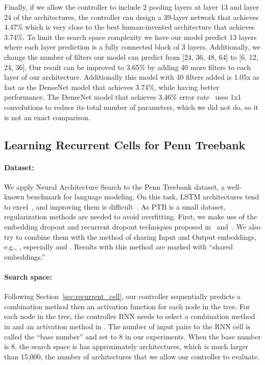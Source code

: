 \documentclass{article} \usepackage{iclr2017_conference,times}
\begin{document}
Finally, if we allow the controller to include 2 pooling layers at layer 13 and layer 24 of the architectures, the controller can design a 39-layer network that achieves 4.47\% which is very close to the best human-invented architecture that achieves 3.74\%. To limit the search space complexity we have our model predict 13 layers where each layer prediction is a fully connected block of 3 layers. Additionally, we change the number of filters our model can predict from [24, 36, 48, 64] to [6, 12, 24, 36]. Our result can be improved to 3.65\% by adding 40 more filters  to each layer of our architecture. Additionally this model with 40 filters added is 1.05x as fast as the DenseNet model that achieves 3.74\%, while having better performance. The DenseNet model that achieves 3.46\% error rate~\citep{Huang2016Densely2} uses 1x1 convolutions to reduce its total number of parameters, which we did not do, so it is not an exact comparison.



\subsection{Learning Recurrent Cells for Penn Treebank}









\paragraph{Dataset:} We apply Neural Architecture Search to the Penn Treebank dataset, a well-known benchmark for language modeling. On this task, LSTM architectures tend to excel~\citep{ZarembaReg, Gal2015}, and improving them is  difficult~\citep{jozefowicz2015empirical}. As PTB is a small dataset, regularization methods are needed to avoid overfitting. First, we make use of the embedding dropout and recurrent dropout techniques proposed in~\cite{ZarembaReg} and~\citep{Gal2015}. We also try to combine them with the method of sharing Input and Output embeddings, e.g., \cite{bengio2003neural,mnih2007three}, especially \cite{SocherEmbedding} and \cite{shareEmbedding}. Results with this method are marked with ``shared embeddings.''



\paragraph{Search space:} Following Section~\ref{sec:recurrent_cell}, our controller sequentially predicts a combination method then an activation function for each node in the tree. 
For each node in the tree, the controller RNN needs to select a combination method in  and an activation method in . The number of input pairs to the RNN cell is called the ``base number'' and set to 8 in our experiments. When the base number is 8, the search space is has approximately  architectures, which is much larger than 15,000, the number of architectures that we allow our controller to evaluate.
\end{document}
